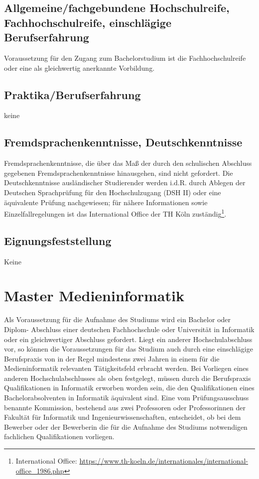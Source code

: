 \subsection{Allgemeine/fachgebundene Hochschulreife,
Fachhochschulreife, einschlägige
Berufserfahrung}\label{allgemeinefachgebundene-hochschulreife-fachhochschulreife-einschluxe4gige-berufserfahrung}

Voraussetzung für den Zugang zum Bachelorstudium ist die
Fachhochschulreife oder eine als gleichwertig anerkannte Vorbildung.

\subsection{Praktika/Berufserfahrung}\label{praktikaberufserfahrung}

keine

\subsection{Fremdsprachenkenntnisse,
Deutschkenntnisse}\label{fremdsprachenkenntnisse-deutschkenntnisse}

Fremdsprachenkenntnisse, die über das Maß der durch den schulischen
Abschluss gegebenen Fremdsprachenkenntnisse hinausgehen, sind nicht
gefordert. Die Deutschkenntnisse ausländischer Studierender werden
i.d.R. durch Ablegen der Deutschen Sprachprüfung für den Hochschulzugang
(DSH II) oder eine äquivalente Prüfung nachgewiesen; für nähere
Informationen sowie Einzelfallregelungen ist das International Office
der TH Köln zuständig\footnote{International Office:
  \url{https://www.th-koeln.de/internationales/international-office_1986.php}}.

\subsection{Eignungsfeststellung}\label{eignungsfeststellung}

Keine

\section{Master Medieninformatik}\label{master-medieninformatik-1}

Als Voraussetzung für die Aufnahme des Studiums wird ein Bachelor oder
Diplom- Abschluss einer deutschen Fachhochschule oder Universität in
Informatik oder ein gleichwertiger Abschluss gefordert. Liegt ein
anderer Hochschulabschluss vor, so können die Voraussetzungen für das
Studium auch durch eine einschlägige Berufspraxis von in der Regel
mindestens zwei Jahren in einem für die Medieninformatik relevanten
Tätigkeitsfeld erbracht werden. Bei Vorliegen eines anderen
Hochschulabschlusses als oben festgelegt, müssen durch die Berufspraxis
Qualifikationen in Informatik erworben worden sein, die den
Qualifikationen eines Bachelorabsolventen in Informatik äquivalent sind.
Eine vom Prüfungsausschuss benannte Kommission, bestehend aus zwei
Professoren oder Professorinnen der Fakultät für Informatik und
Ingenieurwissenschaften, entscheidet, ob bei dem Bewerber oder der
Bewerberin die für die Aufnahme des Studiums notwendigen fachlichen
Qualifikationen vorliegen.

